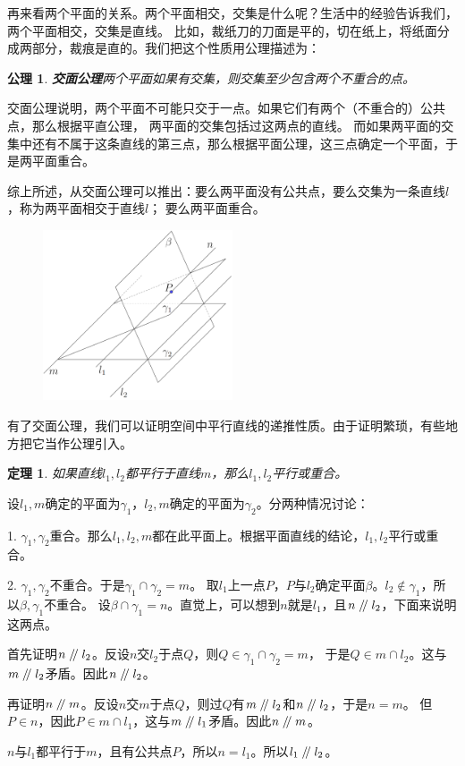 \documentclass[12pt,UTF8]{ctexbook}
\newtheorem{tm}{定理}[section]
\newtheorem{po}{公理}
\renewcommand\parallel{\mathrel{/\mskip-4mu/}}
\begin{document}
再来看两个平面的关系。两个平面相交，交集是什么呢？生活中的经验告诉我们，两个平面相交，交集是直线。
比如，裁纸刀的刀面是平的，切在纸上，将纸面分成两部分，裁痕是直的。我们把这个性质用公理描述为：
\begin{po}{\textbf{交面公理}}\label{po:3}
    两个平面如果有交集，则交集至少包含两个不重合的点。
\end{po}
交面公理说明，两个平面不可能只交于一点。如果它们有两个（不重合的）公共点，那么根据平直公理，
两平面的交集包括过这两点的直线。
而如果两平面的交集中还有不属于这条直线的第三点，那么根据平面公理，这三点确定一个平面，于是两平面重合。

综上所述，从交面公理可以推出：要么两平面没有公共点，要么交集为一条直线$l$，称为两平面相交于直线$l$；
要么两平面重合。

\begin{figure} %
    \vspace{-30pt}
    \flushright
    \includegraphics[width=0.5\textwidth]{三平行1.png}
\end{figure}

有了交面公理，我们可以证明空间中平行直线的递推性质。由于证明繁琐，有些地方把它当作公理引入。
\begin{tm}\label{tm:1-0-10}
    如果直线$l_1,l_2$都平行于直线$m$，那么$l_1,l_2$平行或重合。
\end{tm}
\begin{proof2}
    设$l_1,m$确定的平面为$\gamma_1$，$l_2,m$确定的平面为$\gamma_2$。分两种情况讨论：
    

    1. $\gamma_1, \gamma_2$重合。那么$l_1,l_2,m$都在此平面上。根据平面直线的结论，$l_1,l_2$平行或重合。
    
    2. $\gamma_1, \gamma_2$不重合。于是$\gamma_1\cap \gamma_2 = m$。
    取$l_1$上一点$P$，$P$与$l_2$确定平面$\beta$。$l_2\notin\gamma_1$，所以$\beta,\gamma_1$不重合。
    设$\beta\cap\gamma_1 = n$。直觉上，可以想到$n$就是$l_1$，且$n\parallel l_2$，下面来说明这两点。
    
    首先证明$n\parallel l_2$。反设$n$交$l_2$于点$Q$，则$Q\in\gamma_1\cap\gamma_2=m$，
    于是$Q\in m\cap l_2$。这与$m\parallel l_2$矛盾。因此$n\parallel l_2$。
    
    再证明$n\parallel m$。反设$n$交$m$于点$Q$，则过$Q$有$m\parallel l_2$和$n\parallel l_2$，于是$n=m$。
    但$P\in n$，因此$P\in m\cap l_1$，这与$m\parallel l_1$矛盾。因此$n\parallel m$。
    
    $n$与$l_1$都平行于$m$，且有公共点$P$，所以$n = l_1$。所以$l_1\parallel l_2$。

\end{proof2}
\end{document}

